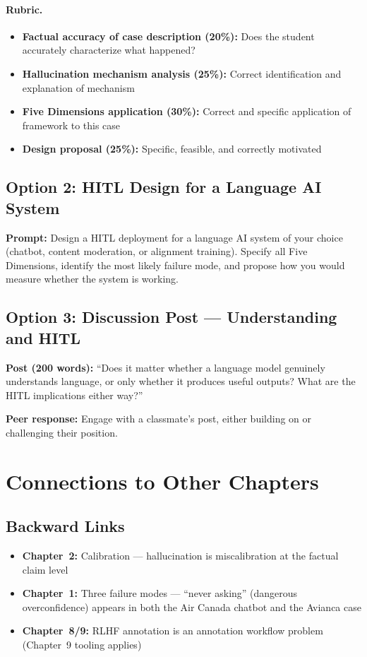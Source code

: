 \paragraph{Rubric.}
\begin{itemize}
    \item \textbf{Factual accuracy of case description (20\%):} Does the student accurately characterize what happened?
    \item \textbf{Hallucination mechanism analysis (25\%):} Correct identification and explanation of mechanism
    \item \textbf{Five Dimensions application (30\%):} Correct and specific application of framework to this case
    \item \textbf{Design proposal (25\%):} Specific, feasible, and correctly motivated
\end{itemize}

\subsection{Option 2: HITL Design for a Language AI System}

\textbf{Prompt:} Design a HITL deployment for a language AI system of your choice (chatbot, content moderation, or alignment training). Specify all Five Dimensions, identify the most likely failure mode, and propose how you would measure whether the system is working.

\subsection{Option 3: Discussion Post --- Understanding and HITL}

\textbf{Post (200 words):} ``Does it matter whether a language model genuinely understands language, or only whether it produces useful outputs? What are the HITL implications either way?''

\textbf{Peer response:} Engage with a classmate's post, either building on or challenging their position.

\section{Connections to Other Chapters}

\subsection{Backward Links}
\begin{itemize}
    \item \textbf{Chapter~2:} Calibration --- hallucination is miscalibration at the factual claim level
    \item \textbf{Chapter~1:} Three failure modes --- ``never asking'' (dangerous overconfidence) appears in both the Air Canada chatbot and the Avianca case
    \item \textbf{Chapter~8/9:} RLHF annotation is an annotation workflow problem (Chapter~9 tooling applies)
\end{itemize}

